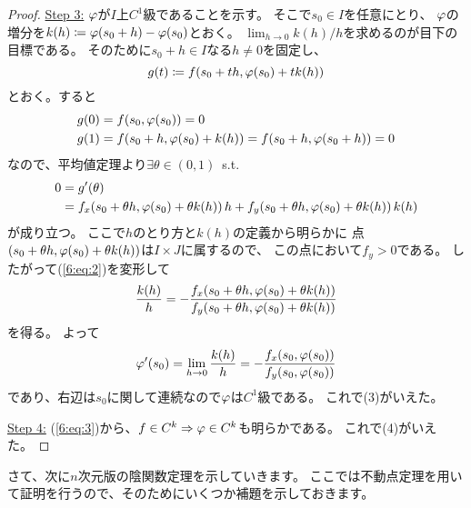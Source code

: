\documentclass[report]{jlreq}
\begin{document}
\begin{proof}
    \underline{Step 3:}
    $\varphi$が$I$上$C^1$級であることを示す。
    そこで$s_0 \in I$を任意にとり、
    $\varphi$の増分を$k(h) \coloneqq \varphi(s_0 + h) - \varphi(s_0)$とおく。
    $\lim_{h \to 0} k(h)/h$を求めるのが目下の目標である。
    そのために$s_0 + h \in I$なる$h \neq 0$を固定し、
    \begin{equation}
        g(t) \coloneqq f(s_0 + th, \varphi(s_0) + t k(h))
    \end{equation}
    とおく。すると
    \begin{equation}
        \begin{split}
            g(0) &= f(s_0, \varphi(s_0)) = 0 \\
            g(1) &= f(s_0 + h, \varphi(s_0) + k(h)) = f(s_0 + h, \varphi(s_0 + h)) = 0
        \end{split}
    \end{equation}
    なので、平均値定理より$\exists \theta \in (0, 1)$\, s.t.
    \begin{equation}
        \begin{split}
            0 &= g'(\theta) \\
                &= f_x(s_0 + \theta h, \varphi(s_0) + \theta k(h))\, h
                + f_y(s_0 + \theta h, \varphi(s_0) + \theta k(h))\, k(h)
        \end{split}
        \label{6:eq:2}
    \end{equation}
    が成り立つ。
    ここで$h$のとり方と$k(h)$の定義から明らかに
    点$(s_0 + \theta h, \varphi(s_0) + \theta k(h))$は$I \times J$に属するので、
    この点において$f_y > 0$である。
    したがって(\ref{6:eq:2})を変形して
    \begin{equation}
        \frac{k(h)}{h}
            = - \frac{f_x(s_0 + \theta h, \varphi(s_0) + \theta k(h))}
            {f_y(s_0 + \theta h, \varphi(s_0) + \theta k(h))}
    \end{equation}
    を得る。
    よって
    \begin{equation}
        \varphi'(s_0) = \lim_{h \to 0} \frac{k(h)}{h} = - \frac{f_x(s_0, \varphi(s_0))}{f_y(s_0, \varphi(s_0))}
        \label{6:eq:3}
    \end{equation}
    であり、右辺は$s_0$に関して連続なので$\varphi$は$C^1$級である。
    これで(3)がいえた。

    \underline{Step 4:}
    (\ref{6:eq:3})から、$f \in C^k \Rightarrow \varphi \in C^k$も明らかである。
    これで(4)がいえた。
\end{proof}



さて、次に$n$次元版の陰関数定理を示していきます。
ここでは不動点定理を用いて証明を行うので、そのためにいくつか補題を示しておきます。
\end{document}
